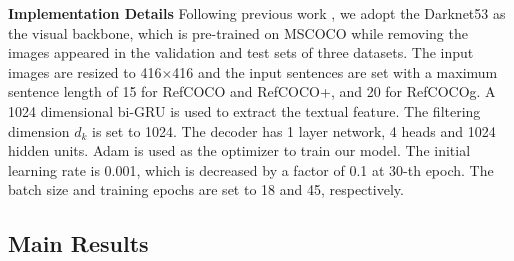 \textbf{Implementation Details}
Following previous work \cite{luo2020multi}, we adopt the Darknet53 \cite{redmon2018yolov3} as the visual backbone, which is pre-trained on MSCOCO while removing the images appeared in the validation and test sets of three datasets. The input images are resized to 416$\times$416 and the input sentences are set with a maximum sentence length of 15 for RefCOCO and RefCOCO+, and 20 for RefCOCOg. A 1024 dimensional bi-GRU is used to extract the textual feature. The filtering dimension $d_{k}$ is set to 1024. The decoder has 1 layer network, 4 heads and 1024 hidden units. 
Adam \cite{Kingma2014Adam}
is used as the optimizer to train our model. The initial learning rate is 0.001, which is decreased by a factor of 0.1 at 30-th epoch. The batch size and training epochs are set to 18 and 45, respectively.

\subsection{Main Results}

